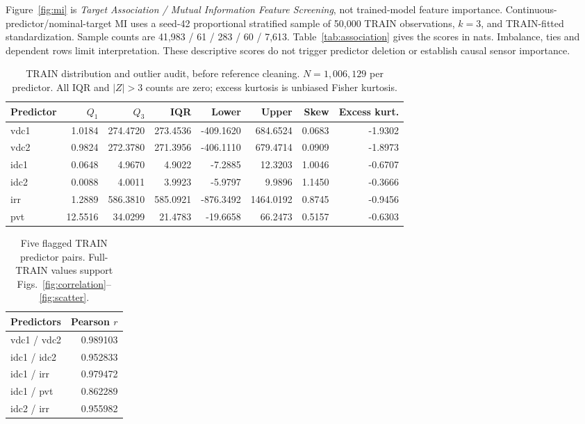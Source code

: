 \documentclass[conference]{IEEEtran}
\begin{document}
Figure~\ref{fig:mi} is \emph{Target Association / Mutual Information Feature Screening}, not trained-model feature importance. Continuous-predictor/nominal-target MI uses a seed-42 proportional stratified sample of 50,000 TRAIN observations, $k=3$, and TRAIN-fitted standardization. Sample counts are 41,983 / 61 / 283 / 60 / 7,613. Table~\ref{tab:association} gives the scores in nats. Imbalance, ties and dependent rows limit interpretation. These descriptive scores do not trigger predictor deletion or establish causal sensor importance.
\begin{table}[!t]
\caption{TRAIN distribution and outlier audit, before reference cleaning. $N=1{,}006{,}129$ per predictor. All IQR and $|Z|>3$ counts are zero; excess kurtosis is unbiased Fisher kurtosis.}\label{tab:outliers}
\centering\footnotesize
\begin{tabularx}{\textwidth}{Yrrrrrrr}
\toprule
Predictor & $Q_1$ & $Q_3$ & IQR & Lower & Upper & Skew & Excess kurt. \\ \midrule
vdc1 & 1.0184 & 274.4720 & 273.4536 & -409.1620 & 684.6524 & 0.0683 & -1.9302 \\
vdc2 & 0.9824 & 272.3780 & 271.3956 & -406.1110 & 679.4714 & 0.0909 & -1.8973 \\
idc1 & 0.0648 & 4.9670 & 4.9022 & -7.2885 & 12.3203 & 1.0046 & -0.6707 \\
idc2 & 0.0088 & 4.0011 & 3.9923 & -5.9797 & 9.9896 & 1.1450 & -0.3666 \\
irr & 1.2889 & 586.3810 & 585.0921 & -876.3492 & 1464.0192 & 0.8745 & -0.9456 \\
pvt & 12.5516 & 34.0299 & 21.4783 & -19.6658 & 66.2473 & 0.5157 & -0.6303 \\
\bottomrule
\end{tabularx}
\end{table}
\begin{table}[!t]
\caption{Five flagged TRAIN predictor pairs. Full-TRAIN values support Figs.~\ref{fig:correlation}--\ref{fig:scatter}.}\label{tab:pairs}
\centering\footnotesize
\begin{tabularx}{\columnwidth}{Yr}
\toprule
Predictors & Pearson $r$ \\ \midrule
vdc1 / vdc2 & 0.989103 \\
idc1 / idc2 & 0.952833 \\
idc1 / irr & 0.979472 \\
idc1 / pvt & 0.862289 \\
idc2 / irr & 0.955982 \\
\bottomrule
\end{tabularx}
\end{table}
\end{document}
